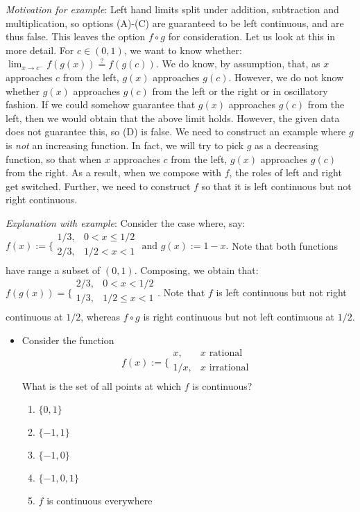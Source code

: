 \emph{Motivation for example}: Left hand limits split under addition,
subtraction and multiplication, so options (A)-(C) are guaranteed to be
left continuous, and are thus false. This leaves the option
\(f \circ g\) for consideration. Let us look at this in more detail. For
\(c \in (0,1)\), we want to know whether:
\(\lim_{x \to c^-} f(g(x)) \stackrel{?}{=} f(g(c))\). We do know, by
assumption, that, as \(x\) approaches \(c\) from the left, \(g(x)\)
approaches \(g(c)\). However, we do not know whether \(g(x)\) approaches
\(g(c)\) from the left or the right or in oscillatory fashion. If we
could somehow guarantee that \(g(x)\) approaches \(g(c)\) from the left,
then we would obtain that the above limit holds. However, the given data
does not guarantee this, so (D) is false. We need to construct an
example where \(g\) is \emph{not} an increasing function. In fact, we
will try to pick \(g\) as a decreasing function, so that when \(x\)
approaches \(c\) from the left, \(g(x)\) approaches \(g(c)\) from the
right. As a result, when we compose with \(f\), the roles of left and
right get switched. Further, we need to construct \(f\) so that it is
left continuous but not right continuous.

\emph{Explanation with example}: Consider the case where, say:
\(f(x) := \bigg\lbrace\begin{array}{rl}1/3,& 0 < x \le 1/2 \\ 2/3, & 1/2 < x < 1 \\\end{array} \text{ and } g(x) := 1 - x.\)
Note that both functions have range a subset of \((0,1)\). Composing, we
obtain that:
\(f(g(x)) = \bigg\lbrace\begin{array}{rl}2/3,& 0 < x < 1/2\\ 1/3, & 1/2 \le x < 1 \\\end{array}.\)
Note that \(f\) is left continuous but not right continuous at \(1/2\),
whereas \(f \circ g\) is right continuous but not left continuous at
\(1/2\).

\begin{itemize}
\item
  Consider the function
  \[f(x) := \bigg\lbrace\begin{array}{rl} x, & x \text{ rational }\\1/x, & x \text{ irrational }\\\end{array}\]
  What is the set of all points at which \(f\) is continuous?

  \begin{enumerate}
  \def\labelenumi{(\Alph{enumi})}
  \tightlist
  \item
    \(\{ 0, 1 \}\)
  \item
    \(\{ -1,1 \}\)
  \item
    \(\{-1,0 \}\)
  \item
    \(\{ -1,0,1 \}\)
  \item
    \(f\) is continuous everywhere
  \end{enumerate}
\end{itemize}

